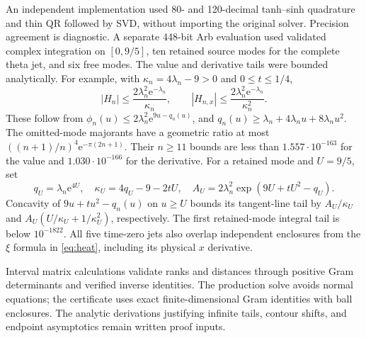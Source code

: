 \documentclass[11pt]{article}
\theoremstyle{remark}\newtheorem{remark}[theorem]{Remark}
\newcommand{\e}{\mathrm e}
\begin{document}
An independent implementation used 80- and 120-decimal tanh--sinh quadrature and thin QR followed by SVD, without importing the original solver. Precision agreement is diagnostic. A separate 448-bit Arb evaluation used validated complex integration on $[0,9/5]$, ten retained source modes for the complete theta jet, and six free modes. The value and derivative tails were bounded analytically. For example, with $\kappa_n=4\lambda_n-9>0$ and $0\le t\le1/4$,
\begin{equation}\label{eq:tailn}
 |H_n|\le\frac{2\lambda_n^2\e^{-\lambda_n}}{\kappa_n},\qquad
 |H_{n,x}|\le\frac{2\lambda_n^2\e^{-\lambda_n}}{\kappa_n^2}.
\end{equation}
These follow from $\phi_n(u)\le2\lambda_n^2\e^{9u-q_n(u)}$, and $q_n(u)\ge\lambda_n+4\lambda_nu+8\lambda_nu^2$. The omitted-mode majorants have a geometric ratio at most $((n+1)/n)^4\e^{-\pi(2n+1)}$. Their $n\ge11$ bounds are less than $1.557\cdot10^{-163}$ for the value and $1.030\cdot10^{-166}$ for the derivative. For a retained mode and $U=9/5$, set
\[
 q_U=\lambda_n\e^{4U},\quad \kappa_U=4q_U-9-2tU,\quad
 A_U=2\lambda_n^2\exp(9U+tU^2-q_U).
\]
Concavity of $9u+tu^2-q_n(u)$ on $u\ge U$ bounds its tangent-line tail by $A_U/\kappa_U$ and $A_U(U/\kappa_U+1/\kappa_U^2)$, respectively. The first retained-mode integral tail is below $10^{-1822}$. All five time-zero jets also overlap independent enclosures from the $\xi$ formula in \eqref{eq:heat}, including its physical $x$ derivative.

Interval matrix calculations validate ranks and distances through positive Gram determinants and verified inverse identities. The production solve avoids normal equations; the certificate uses exact finite-dimensional Gram identities with ball enclosures. The analytic derivations justifying infinite tails, contour shifts, and endpoint asymptotics remain written proof inputs.
\end{document}
